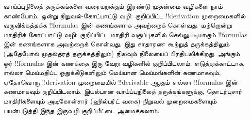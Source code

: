 \documentclass[../../../include/open-logic-section]{subfiles}
\begin{document}
வாய்ப்புநிலைத் தருக்கங்களை வரையறுக்கும் இரண்டு முதன்மை வழிகளை
நாம் காண்போம். ஒன்று நிறுவல்-கோட்பாட்டு வழி: குறிப்பிட்ட
!!{derivation} முறைமைகளில் வருவிக்கத்தக்க !!{formula}s இன்
கணங்களாக அவற்றைக் கொள்வது. மற்றொன்று மாதிரிக் கோட்பாட்டு வழி:
குறிப்பிட்ட மாதிரி வகுப்புகளில் செல்லுபடியாகும் !!{formula}s
இன் கணங்களாக அவற்றைக் கொள்வது. இது சாதாரண கூற்றுத்
தருக்கத்திலும் (அதேபோல் முதல்தரத் தருக்கத்திலும்) நிலவும்
நிலையைப் பிரதிபலிக்கிறது. அங்கும் ஓர் !!{formula}s இன்
கணத்தை இரு வேறு வழிகளில் குறிப்பிடலாம்: எடுத்துக்காட்டாக,
எல்லா மெய்மதிப்பு ஒதுக்கீடுகளிலும் மெய்யான மெய்மங்களின்
கணமாகவும், ஏதோவொரு !!{derivation} முறைமையில்
!!{derivable} ஆகும் எல்லா !!{formula}s இன்
கணமாகவும் குறிப்பிடலாம். இயல்பான வாய்ப்புநிலைத் தருக்கங்களுக்கு,
தொடர்புசார் மாதிரிகளையும் அடிகோள்சார் (ஹில்பர்ட் வகை)
நிறுவல் முறைமைகளையும் பயன்படுத்தி இந்த இருவழி
குறிப்பீட்டை அமைக்கலாம்.
\end{document}
